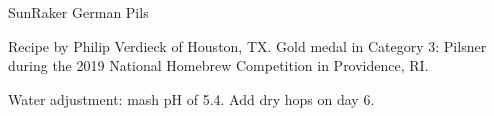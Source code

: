 \begin{recipe}{SunRaker German Pils}

\begin{aboutblock}
Recipe by Philip Verdieck of Houston, TX. Gold medal in Category 3: Pilsner
during the 2019 National Homebrew Competition in Providence, RI. \sourceaha
\end{aboutblock}


\begin{methodandtiming}
 
\begin{mashsteps}
\end{mashsteps}

\begin{fermentationsteps}
\end{fermentationsteps}

\begin{directions}
Water adjustment: mash pH of 5.4. Add dry hops on day 6.
\end{directions}

\end{methodandtiming}

\recipebreak

\begin{ingredientsblock}

\begin{malts}
\end{malts}

\begin{hops}
\end{hops}


\end{ingredientsblock}

\end{recipe}

